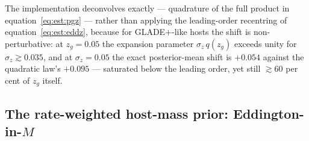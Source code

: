 The implementation deconvolves exactly --- quadrature of the full product in equation~\eqref{eq:est:pgz} --- rather than applying the leading-order recentring of equation~\eqref{eq:est:eddz}, because for GLADE+-like hosts the shift is non-perturbative: at $z_g = 0.05$ the expansion parameter $\sigma_z\, q(z_g)$ exceeds unity for $\sigma_z \gtrsim 0.035$, and at $\sigma_z = 0.05$ the exact posterior-mean shift is $+0.054$ against the quadratic law's $+0.095$ --- saturated below the leading order, yet still ${\gtrsim}60$ per cent of $z_g$ itself. %

\subsection{The rate-weighted host-mass prior: Eddington-in-$M$}
\label{sec:est:eddm}

